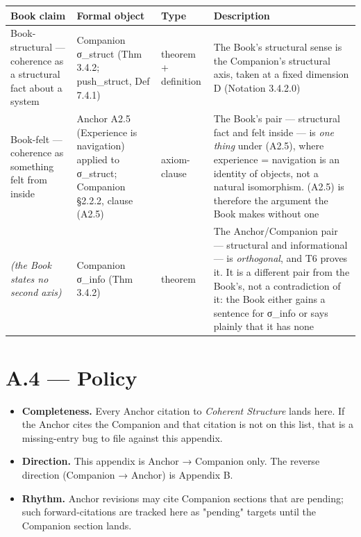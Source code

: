 \documentclass[11pt, openany]{book}
\newcommand{\sectionbreak}{\clearpage}
\begin{document}
\begingroup\setlength{\tabcolsep}{3pt}\renewcommand{\arraystretch}{1.15}\footnotesize
\begin{center}
\begin{tabular}{p{0.60in} p{0.87in} p{0.55in} p{2.26in}}
\toprule
Book claim & Formal object & Type & Description \\
\midrule
Book-structural --- coherence as a structural fact about a system & Companion σ\_\allowbreak{}struct (Thm 3.4.2; push\_\allowbreak{}struct, Def 7.4.1) & theorem + definition & The Book's structural sense is the Companion's structural axis, taken at a fixed dimension D (Notation 3.4.2.0) \\
Book-felt --- coherence as something felt from inside & Anchor A2.5 (Experience is navigation) applied to σ\_\allowbreak{}struct; Companion §2.2.2, clause (A2.5) & axiom-clause & The Book's pair --- structural fact and felt inside --- is \textit{one thing} under (A2.5), where experience = navigation is an identity of objects, not a natural isomorphism. (A2.5) is therefore the argument the Book makes without one \\
\textit{(the Book states no second axis)} & Companion σ\_\allowbreak{}info (Thm 3.4.2) & theorem & The Anchor/\allowbreak Companion pair --- structural and informational --- is \textit{orthogonal}, and T6 proves it. It is a different pair from the Book's, not a contradiction of it: the Book either gains a sentence for σ\_\allowbreak{}info or says plainly that it has none \\
\bottomrule
\end{tabular}
\end{center}
\endgroup
\sectionbreak

\section{A.4 --- Policy}

\begin{itemize}
\item \textbf{Completeness.} Every Anchor citation to \textit{Coherent Structure} lands here. If the Anchor cites the Companion and that citation is not on this list, that is a missing-entry bug to file against this appendix.
\item \textbf{Direction.} This appendix is Anchor → Companion only. The reverse direction (Companion → Anchor) is Appendix B.
\item \textbf{Rhythm.} Anchor revisions may cite Companion sections that are pending; such forward-citations are tracked here as "pending" targets until the Companion section lands.
\end{itemize}
\end{document}
